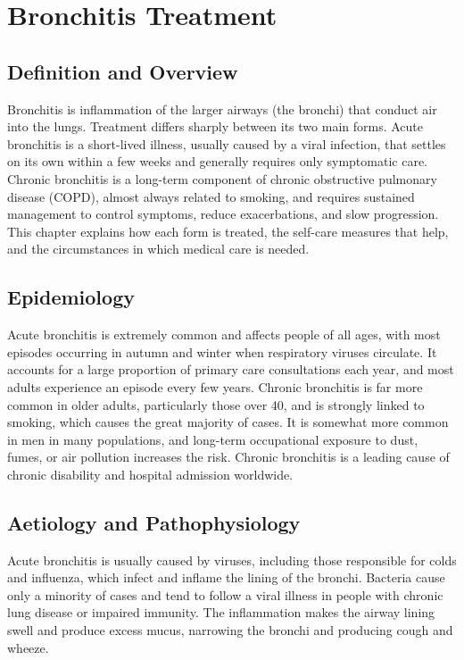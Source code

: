 \chapter{Bronchitis Treatment}

\section*{Definition and Overview}
Bronchitis is inflammation of the larger airways (the bronchi) that conduct air into the lungs. Treatment differs sharply between its two main forms. Acute bronchitis is a short-lived illness, usually caused by a viral infection, that settles on its own within a few weeks and generally requires only symptomatic care. Chronic bronchitis is a long-term component of chronic obstructive pulmonary disease (COPD), almost always related to smoking, and requires sustained management to control symptoms, reduce exacerbations, and slow progression. This chapter explains how each form is treated, the self-care measures that help, and the circumstances in which medical care is needed.

\section*{Epidemiology}
Acute bronchitis is extremely common and affects people of all ages, with most episodes occurring in autumn and winter when respiratory viruses circulate. It accounts for a large proportion of primary care consultations each year, and most adults experience an episode every few years. Chronic bronchitis is far more common in older adults, particularly those over 40, and is strongly linked to smoking, which causes the great majority of cases. It is somewhat more common in men in many populations, and long-term occupational exposure to dust, fumes, or air pollution increases the risk. Chronic bronchitis is a leading cause of chronic disability and hospital admission worldwide.

\section*{Aetiology and Pathophysiology}
Acute bronchitis is usually caused by viruses, including those responsible for colds and influenza, which infect and inflame the lining of the bronchi. Bacteria cause only a minority of cases and tend to follow a viral illness in people with chronic lung disease or impaired immunity. The inflammation makes the airway lining swell and produce excess mucus, narrowing the bronchi and producing cough and wheeze.

